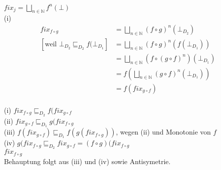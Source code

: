 \documentclass[ngerman,a4paper]{report}
\begin{document}
$fix_j = \bigsqcup\limits_{n\in\mathbb{N}} f^n (\bot)$\\
(i)
\begin{align*}
	fix_{f\circ g}& = \bigsqcup\limits_{n\in\mathbb{N}}(f\circ g)^n (\bot_{D_2})\\
	\left[\text{weil } \bot_{D_2}\sqsubseteq_{D_2} f(\bot_{D_1}\right]	&=\bigsqcup\limits_{n\in\mathbb{N}} (f \circ g)^n (f(\bot_{D_1}))\\
	&=\bigsqcup\limits_{n\in\mathbb{N}} (f \circ (g\circ f)^n) (\bot_{D_1})\\
	&=f(\bigsqcup\limits_{n\in\mathbb{N}} (g \circ f)^n (\bot_{D_1}))\\
	&=f(fix_{g\circ f})\\
\end{align*}

(i) $fix_{f\circ g} \sqsubseteq_{D_2} f(fix_{g\circ f}$\\
(ii) $ fix_{g\circ f} \sqsubseteq_{D_1} g(fix_{f\circ g}$\\
(iii) $f(fix_{g\circ f}) \sqsubseteq_{D_1} f(g(fix_{f\circ g}))$, wegen (ii) und Monotonie von $f$\\
(iv) $g(fix_{f\circ g} \sqsubseteq_{D_2} fix_{g\circ f} = (f\circ g) (fix_{f\circ g}$\\
$fix_{f\circ g}$\\
Behauptung folgt aus (iii) und (iv) sowie Antisymetrie.
\end{document}
